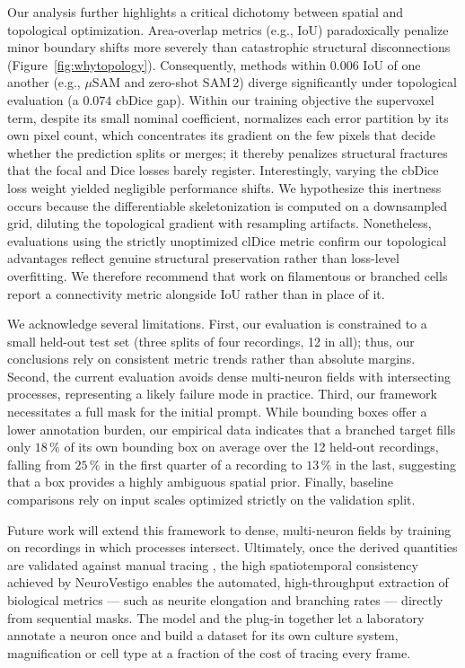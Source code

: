 \documentclass[11pt,a4paper]{article}
\begin{document}
Our analysis further highlights a critical dichotomy between spatial and
topological optimization. Area-overlap metrics (e.g., IoU) paradoxically
penalize minor boundary shifts more severely than catastrophic structural
disconnections (Figure~\ref{fig:whytopology}). Consequently, methods
within $0.006$ IoU of one another (e.g., $\mu$SAM and zero-shot SAM\,2) diverge
significantly under topological evaluation (a $0.074$ cbDice gap).
Within our training objective the supervoxel term, despite its small
nominal coefficient, normalizes each error partition by its own pixel
count, which concentrates its gradient on the few pixels that decide whether
the prediction splits or merges; it thereby penalizes structural fractures
that the focal and Dice losses barely register. Interestingly, varying the cbDice loss weight
yielded negligible performance shifts. We hypothesize this inertness occurs
because the differentiable skeletonization is computed on a downsampled
grid, diluting the topological gradient with resampling artifacts.
Nonetheless, evaluations using the strictly unoptimized clDice metric
confirm our topological advantages reflect genuine structural preservation
rather than loss-level overfitting. We therefore recommend that work on
filamentous or branched cells report a connectivity metric alongside IoU
rather than in place of it.

We acknowledge several limitations. First, our evaluation is constrained to
a small held-out test set (three splits of four recordings, 12 in all); thus, our conclusions rely on
consistent metric trends rather than absolute margins. Second, the current
evaluation avoids dense multi-neuron fields with intersecting processes,
representing a likely failure mode in practice. Third, our framework
necessitates a full mask for the initial prompt. While bounding boxes offer
a lower annotation burden, our empirical data indicates that a branched
target fills only $18\,\%$ of its own bounding box on average over the 12
held-out recordings, falling from $25\,\%$ in the first quarter of a
recording to $13\,\%$ in the last,
suggesting that a box provides a highly ambiguous spatial prior. Finally,
baseline comparisons rely on input scales optimized strictly on the
validation split.

Future work will extend this framework to dense, multi-neuron fields by
training on recordings in which processes intersect. Ultimately, once the
derived quantities are validated against manual tracing
\cite{berkovich2025neurite}, the high spatiotemporal consistency achieved by
NeuroVestigo enables the automated, high-throughput extraction of biological
metrics --- such as neurite elongation and branching rates --- directly from
sequential masks. The model and the plug-in together let a laboratory
annotate a neuron once and build a dataset for its own culture system,
magnification or cell type at a fraction of the cost of tracing every frame.
\end{document}
